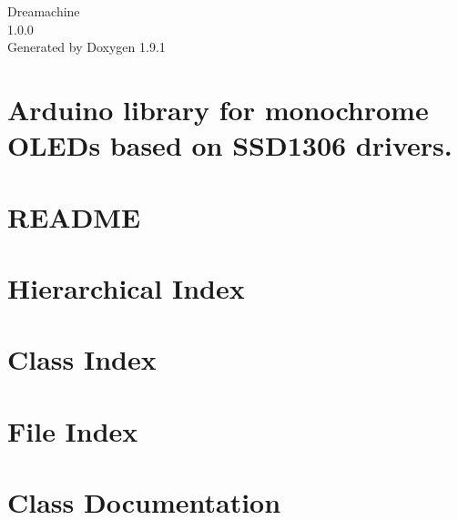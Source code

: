 \let\mypdfximage\pdfximage\def\pdfximage{\immediate\mypdfximage}\documentclass[twoside]{book}
\newcommand{\+}{\discretionary{\mbox{\scriptsize$\hookleftarrow$}}{}{}}
\newcommand{\clearemptydoublepage}{%
  \newpage{\pagestyle{empty}\cleardoublepage}%
}
\begin{document}
\raggedbottom

\hypersetup{pageanchor=false,
             bookmarksnumbered=true,
             pdfencoding=unicode
            }
\begin{titlepage}
\vspace*{7cm}
\begin{center}%
{\Large Dreamachine \\[1ex]\large 1.\+0.\+0 }\\
\vspace*{1cm}
{\large Generated by Doxygen 1.9.1}\\
\end{center}
\end{titlepage}
\clearemptydoublepage
{}
\tableofcontents
\clearemptydoublepage
{}
\hypersetup{pageanchor=true}

\chapter{Arduino library for monochrome OLEDs based on SSD1306 drivers.}
\label{index}\hypertarget{index}{}
\chapter{README}
\label{md_lib__s_s_d1306__mod__r_e_a_d_m_e}

\chapter{Hierarchical Index}

\chapter{Class Index}

\chapter{File Index}

\chapter{Class Documentation}


























\end{document}
